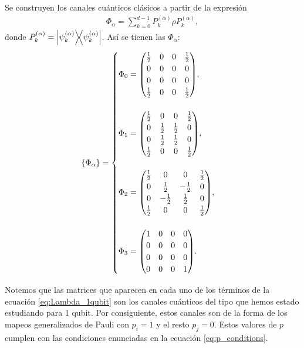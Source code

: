 \documentclass[11pt,letterpaper]{article}
\begin{document}
Se construyen los canales cuánticos clásicos a partir de la expresión
\begin{align}
	\Phi _{\alpha} = \sum_{k=0}^{d-1} P_k^{(\alpha)}\rho P_k^{(\alpha)},
\end{align}
donde $P_k^{(\alpha)} = \dyad{\psi_k^{(\alpha)}}{\psi_k^{(\alpha)}}$. Así se tienen las $\Phi _{\alpha}$:
\begin{equation}
\{ \Phi _{\alpha} \}= 
\begin{cases}
\Phi _0 = \mqty(\frac{1}{2} & 0 & 0 & \frac{1}{2}\\ 0 & 0 & 0 & 0\\ 0 & 0 & 0 & 0\\ \frac{1}{2} & 0 & 0 & \frac{1}{2}), \\
\\
\Phi _1 = \mqty(\frac{1}{2} & 0 & 0 & \frac{1}{2}\\ 0 & \frac{1}{2} & \frac{1}{2} & 0\\ 0 & \frac{1}{2} & \frac{1}{2} & 0\\ \frac{1}{2} & 0 & 0 & \frac{1}{2}), \\
\\
\Phi _2 = \mqty(\frac{1}{2} & 0 & 0 & \frac{1}{2}\\ 0 & \frac{1}{2} & -\frac{1}{2} & 0\\ 0 & -\frac{1}{2} & \frac{1}{2} & 0\\ \frac{1}{2} & 0 & 0 & \frac{1}{2}), \\
\\
\Phi _3 = \mqty(1 & 0 & 0 & 0\\ 0 & 0 & 0 & 0\\ 0 & 0 & 0 & 0\\ 0 & 0 & 0 & 1). \\
\end{cases}
\label{eq:Phi_alphas-1qubit}
\end{equation}

Notemos que las matrices que aparecen en cada uno de los términos de la ecuación \eqref{eq:Lambda_1qubit} son los canales cuánticos del tipo que hemos estado estudiando para 1 qubit. Por consiguiente, estos canales son de la forma de los mapeos generalizados de Pauli con $p_i=1$ y el resto $p_j=0$. Estos valores de $p$ cumplen con las condiciones enunciadas en la ecuación \eqref{eq:p_conditions}.
\end{document}
